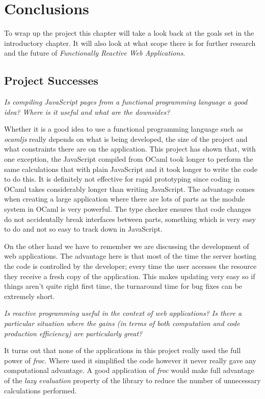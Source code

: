 \chapter{Conclusions}
To wrap up the project this chapter will take a look back at the goals set in the introductory chapter. It will also look at what scope there is for further research and the future of \emph{Functionally Reactive Web Applications}.

\section{Project Successes}
\emph{Is compiling JavaScript pages from a functional programming language a good idea? Where is it useful and what are the downsides?}

Whether it is a good idea to use a functional programming language such as \emph{ocamljs} really depends on what is being developed, the size of the project and what constraints there are on the application. This project has shown that, with one exception, the JavaScript compiled from OCaml took longer to perform the same calculations that with plain JavaScript and it took longer to write the code to do this. It is definitely not effective for rapid prototyping since coding in OCaml takes considerably longer than writing JavaScript. The advantage comes when creating a large application where there are lots of parts as the module system in OCaml is very powerful. The type checker ensures that code changes do not accidentally break interfaces between parts, something which is very easy to do and not so easy to track down in JavaScript.

On the other hand we have to remember we are discussing the development of web applications. The advantage here is that most of the time the server hosting the code is controlled by the developer; every time the user accesses the resource they receive a fresh copy of the application. This makes updating very easy so if things aren't quite right first time, the turnaround time for bug fixes can be extremely short.

\emph{Is reactive programming useful in the context of web applications? Is there a particular situation where the gains (in terms of both computation and code production efficiency) are particularly great?}

It turns out that none of the applications in this project really used the full power of \emph{froc}. Where used it simplified the code however it never really gave any computational advantage. A good application of \emph{froc} would make full advantage of the \emph{lazy evaluation} property of the library to reduce the number of unnecessary calculations performed.

